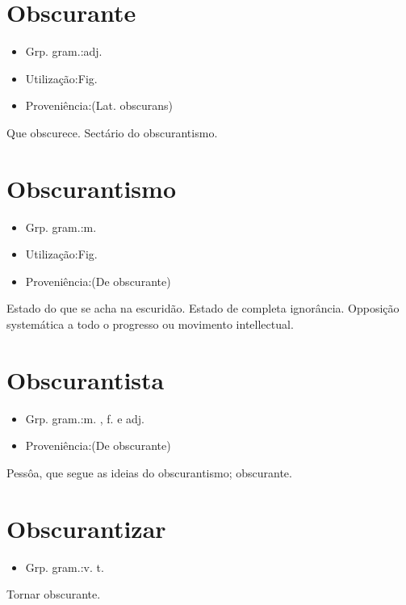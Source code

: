 \section{Obscurante}
\begin{itemize}
\item {Grp. gram.:adj.}
\end{itemize}
\begin{itemize}
\item {Utilização:Fig.}
\end{itemize}
\begin{itemize}
\item {Proveniência:(Lat. \textunderscore obscurans\textunderscore )}
\end{itemize}
Que obscurece.
Sectário do obscurantismo.
\section{Obscurantismo}
\begin{itemize}
\item {Grp. gram.:m.}
\end{itemize}
\begin{itemize}
\item {Utilização:Fig.}
\end{itemize}
\begin{itemize}
\item {Proveniência:(De \textunderscore obscurante\textunderscore )}
\end{itemize}
Estado do que se acha na escuridão.
Estado de completa ignorância.
Opposição systemática a todo o progresso ou movimento intellectual.
\section{Obscurantista}
\begin{itemize}
\item {Grp. gram.:m. ,  f.  e  adj.}
\end{itemize}
\begin{itemize}
\item {Proveniência:(De \textunderscore obscurante\textunderscore )}
\end{itemize}
Pessôa, que segue as ideias do obscurantismo; obscurante.
\section{Obscurantizar}
\begin{itemize}
\item {Grp. gram.:v. t.}
\end{itemize}
Tornar obscurante.

